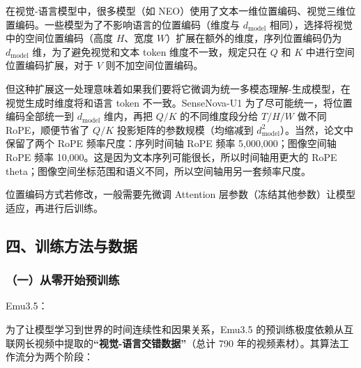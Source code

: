 在视觉-语言模型中，很多模型（如 NEO）使用了文本一维位置编码、视觉三维位置编码。一些模型为了不影响语言的位置编码（维度与 \(d_{\mathrm{model}}\) 相同），选择将视觉中的空间位置编码（高度 \(H\)、宽度 \(W\)）扩展在额外的维度，序列位置编码仍为 \(d_{\mathrm{model}}\) 维，为了避免视觉和文本 token 维度不一致，规定只在 \(Q\) 和 \(K\) 中进行空间位置编码扩展，对于 \(V\) 则不加空间位置编码。

但这种扩展这一处理意味着如果我们要将它微调为统一多模态理解-生成模型，在视觉生成时维度将和语言 token 不一致。SenseNova-U1 为了尽可能统一，将位置编码全部统一到 \(d_{\mathrm{model}}\) 维内，再把 \(Q/K\) 的不同维度段分给 \(T/H/W\) 做不同 RoPE，顺便节省了 \(Q/K\) 投影矩阵的参数规模（均缩减到 \(d_{\mathrm{model}}^2\)）。当然，论文中保留了两个 RoPE 频率尺度：序列时间轴 RoPE 频率 5,000,000；图像空间轴 RoPE 频率 10,000。这是因为文本序列可能很长，所以时间轴用更大的 RoPE theta；图像空间坐标范围和语义不同，所以空间轴用另一套频率尺度。

位置编码方式若修改，一般需要先微调 Attention 层参数（冻结其他参数）让模型适应，再进行后训练。

\hypertarget{ux56dbux8badux7ec3ux65b9ux6cd5ux4e0eux6570ux636e}{%
\subsection{四、训练方法与数据}\label{ux56dbux8badux7ec3ux65b9ux6cd5ux4e0eux6570ux636e}}

\hypertarget{ux4e00ux4eceux96f6ux5f00ux59cbux9884ux8badux7ec3}{%
\subsubsection{（一）从零开始预训练}\label{ux4e00ux4eceux96f6ux5f00ux59cbux9884ux8badux7ec3}}

Emu3.5：

为了让模型学习到世界的时间连续性和因果关系，Emu3.5 的预训练极度依赖从互联网长视频中提取的\textbf{``视觉-语言交错数据''}（总计 790 年的视频素材）。其算法工作流分为两个阶段：


